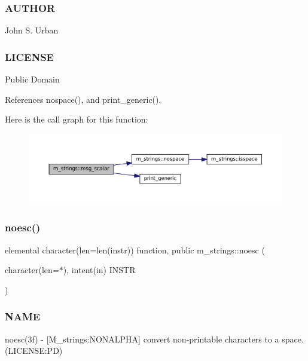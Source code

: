\subsubsection*{A\+U\+T\+H\+OR}

John S. Urban \subsubsection*{L\+I\+C\+E\+N\+SE}

Public Domain 

References nospace(), and print\+\_\+generic().

Here is the call graph for this function\+:
\nopagebreak
\begin{figure}[H]
\begin{center}
\leavevmode
\includegraphics[width=350pt]{namespacem__strings_a926d1d9f529487149f4e0a1de8294122_cgraph}
\end{center}
\end{figure}
\mbox{\label{namespacem__strings_a5d72fde097444c689f1822c5ad95e03d}} 
\subsubsection{\texorpdfstring{noesc()}{noesc()}}
{\footnotesize\ttfamily elemental character(len=len(instr)) function, public m\+\_\+strings\+::noesc (\begin{DoxyParamCaption}\item[{character(len=$\ast$), intent(in)}]{I\+N\+S\+TR }\end{DoxyParamCaption})}



\subsubsection*{N\+A\+ME}

noesc(3f) -\/ \mbox{[}M\+\_\+strings\+:N\+O\+N\+A\+L\+P\+HA\mbox{]} convert non-\/printable characters to a space. (L\+I\+C\+E\+N\+SE\+:PD) 

